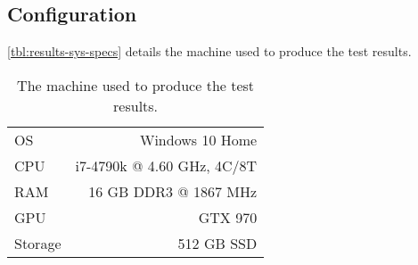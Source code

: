 \subsection{Configuration}

\autoref{tbl:results-sys-specs} details the machine used to produce the test results.

\begin{table}[H] 
    \centering
    \begin{tabular}{l|r}
        \toprule

        OS & Windows 10 Home \\
        CPU & i7-4790k @ 4.60 GHz, 4C/8T \\
        RAM & 16 GB DDR3 @ 1867 MHz \\
        GPU & GTX 970 \\
        Storage & 512 GB SSD \\

        \bottomrule
    \end{tabular}
    \caption{The machine used to produce the test results.}
    \label{tbl:results-sys-specs}
\end{table}